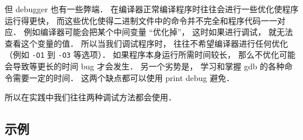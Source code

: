 但 debugger 也有一些弊端． 在编译器正常编译程序时往往会进行一些优化使程序运行得更快， 而这些优化使得二进制文件中的命令并不完全和程序代码一一对应． 例如编译器可能会把某个中间变量 “优化掉”， 这时如果进行调试， 就无法查看这个变量的值． 所以当我们调试程序时， 往往不希望编译器进行任何优化（例如 \verb|-O1| 到 \verb|-O3| 等选项）． 如果程序本身运行所需时间较长， 那么不优化可能会导致等更长的时间 bug 才会发生． 另一个劣势是， 学习和掌握 gdb 的各种命令需要一定的时间． 这两个缺点都可以使用 print debug 避免．

所以在实践中我们往往两种调试方法都会使用．

\subsection{示例}

